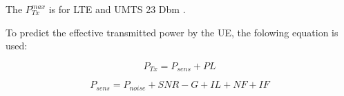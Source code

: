 The $P^{max}_{Tx}$ is for LTE and UMTS 23 Dbm \cite{J11_maxTpxUE, J10_RDP}.

To predict the effective transmitted power by the \gls{UE}, the folowing equation is used:

\begin{equation}
P_{Tx} = P_{sens} + PL
\label{eq:calculatesar}
\end{equation}

\begin{equation}
P_{sens} = P_{noise} + SNR - G + IL + NF + IF
\label{eq:calculatepsens}
\end{equation}